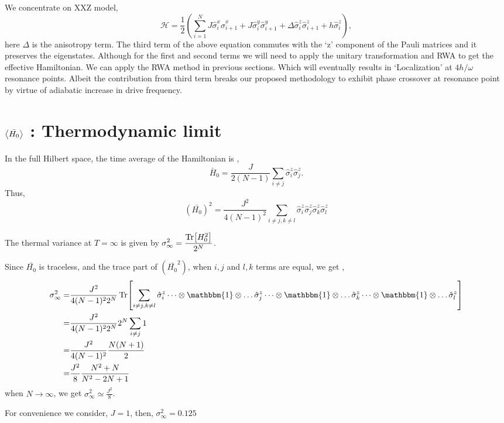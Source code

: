 \documentclass[a4paper,11pt]{article}
\begin{document}
We concentrate on XXZ model,
\begin{equation}
	\mathcal{H} = \frac12 \left( \sum_{i=1}^N J \hat{\sigma}^x_i \hat{\sigma}^x_{i+1} +J  \hat{\sigma}^y_i \hat{\sigma}^y_{i+1} + \Delta \hat{\sigma}^z_i \hat{\sigma}^z_{i+1} + h  \hat{\sigma}^z_i\right),
\end{equation}
here $\Delta$ is the anisotropy term. The third term of the above equation commutes with the `z' component of the Pauli matrices and it preserves the eigenstates. 
Although for the first and second terms we will need to apply the unitary transformation and RWA to get the effective Hamiltonian. We can apply the RWA method in previous sections. Which will eventually results in `Localization' at $4h/\omega$ resonance points. Albeit the contribution from third term breaks our proposed methodology to exhibit phase crossover at resonance point by virtue of adiabatic increase in drive frequency.

\section{$\expval{\bar{H_0}}$ : Thermodynamic limit}
In the full Hilbert space, the time average of the Hamiltonian is ,
\begin{equation*}
\bar{H}_0 = \frac{J}{2(N-1)}\sum_{i\neq j}\hat{\sigma}^z_i \hat{\sigma}^z_j.
\end{equation*}
Thus,
\begin{equation}
	\left(\bar{H_0}\right)^2 = \frac{J^2}{4(N-1)^2}\sum_{i\neq j, k \neq l} \hat{\sigma}^z_i \hat{\sigma}^z_j \hat{\sigma}^z_k \hat{\sigma}^z_l
\end{equation}

The thermal variance at $T= \infty$ is given by $\displaystyle \sigma^2_{\infty} = \frac{\Tr[H^2_0]}{2^N}$. 

Since $\bar{H_0}$ is traceless, and the trace part of $\left(\bar{H_0}^2\right)$, when $i,j$ and $l,k$ terms are equal, we get ,
\begin{align*}
\sigma_\infty^2 =& \frac{J^2}{4(N-1)^2 2^N}\Tr[\sum_{i\neq j, k \neq l} \hat{\sigma}^z_i \dots\otimes \mathbbm{1} \otimes \dots \hat{\sigma}^z_j \dots\otimes \mathbbm{1} \otimes \dots \hat{\sigma}^z_k\dots\otimes \mathbbm{1} \otimes \dots \hat{\sigma}^z_l ]\\
=& \frac{J^2}{4(N-1)^2 2^N} 2^N \sum_{i\neq j} 1\\
=& \frac{J^2}{4(N-1)^2} \frac{N(N+1)}{2}\\
=& \frac{J^2}{8} \frac{N^2+N}{N^2-2N+1}
\end{align*}
when $N\rightarrow \infty$, we get $\displaystyle \sigma_\infty^2 \simeq \frac{J^2}{8}$. 

For convenience we consider, $J=1$, then, $\sigma_\infty^2 = 0.125$ 
\end{document}
